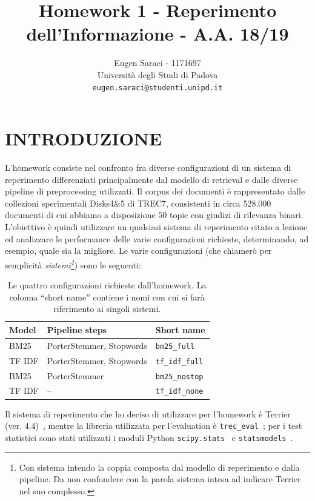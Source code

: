 \documentclass[letterpaper, 10 pt, conference]{ieeeconf}  %
\title{\LARGE \bf
Homework 1 - Reperimento dell'Informazione - A.A. 18/19
}
\author{Eugen Saraci - 1171697 \\ 
        Università degli Studi di Padova\\
        {\tt\small eugen.saraci@studenti.unipd.it}%
}
\begin{document}
\maketitle
\thispagestyle{empty}
\pagestyle{empty}


\section{INTRODUZIONE}
L'homework consiste nel confronto fra diverse configurazioni di un sistema di reperimento differenziati principalmente dal modello di retrieval e dalle diverse pipeline di preprocessing utilizzati. Il corpus dei documenti è rappresentato dalle collezioni sperimentali Disks4\&5 di TREC7, consistenti in circa 528.000 documenti di cui abbiamo a disposizione 50 topic con giudizi di rilevanza binari. L'obiettivo è quindi utilizzare un qualsiasi sistema di reperimento citato a lezione ed analizzare le performance delle varie configurazioni richieste, determinando, ad esempio, quale sia la migliore.
\noindent
Le varie configurazioni (che chiamerò per semplicità \textit{sistemi\footnote{Con sistema intendo la coppia composta dal modello di reperimento e dalla pipeline. Da non confondere con la parola sistema intesa ad indicare Terrier nel suo complesso.}}) sono le seguenti:

\begin{table}[h]
\centering
\begin{tabular}{|l|l|l|}
\hline
\textbf{Model} & \textbf{Pipeline steps}        & \textbf{Short name} \\ \hline
BM25                            & PorterStemmer, Stopwords & \texttt{bm25\_full}          \\ 
TF IDF                          & PorterStemmer, Stopwords & \texttt{tf\_idf\_full}       \\ 
BM25                            & PorterStemmer            & \texttt{bm25\_nostop}        \\
TF IDF                          & --                       & \texttt{tf\_idf\_none}       \\ \hline 
\end{tabular}
\caption{Le quattro configurazioni richieste dall'homework. La colonna ``short name'' contiene i nomi con cui si farà riferimento ai singoli sistemi.}
\label{tab:systems}
\end{table}

Il sistema di reperimento che ho deciso di utilizzare per l'homework è Terrier (ver. 4.4)~\cite{terrier}, mentre la libreria utilizzata per l'evaluation è \texttt{trec\_eval}~\cite{treceval}; per i test statistici sono stati utilizzati i moduli Python \texttt{scipy.stats}~\cite{scipy} e \texttt{statsmodels}~\cite{statsmodels}.
\end{document}
